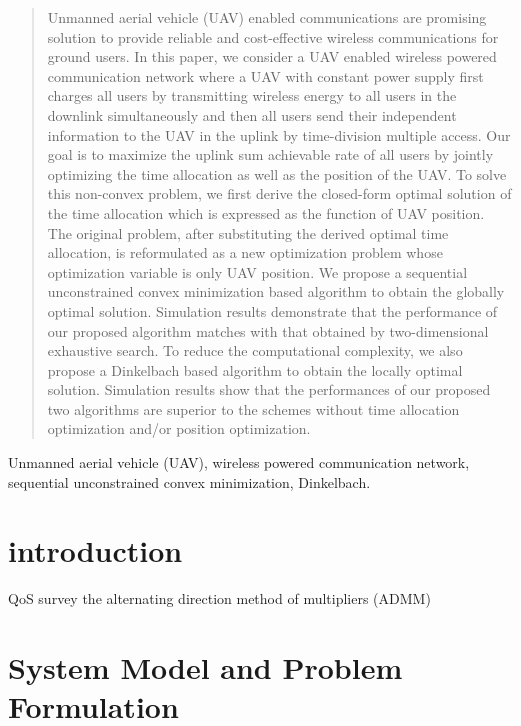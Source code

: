 \documentclass[journal]{IEEEtran}
\begin{document}
\maketitle
\begin{abstract}
Unmanned aerial vehicle (UAV) enabled communications are promising solution to provide reliable and cost-effective wireless communications
for ground users. In this paper, we consider a UAV enabled wireless powered communication network where a UAV with constant power supply first charges all users by transmitting wireless energy to all users in the downlink simultaneously and then all users send their independent information to the UAV in the uplink by time-division multiple access. Our goal is to maximize the uplink sum achievable rate of all users by jointly optimizing the time allocation as well as the position of the UAV. To solve this non-convex problem, we first derive the closed-form optimal solution of the time allocation which is expressed as the function of UAV position. The original problem, after substituting the derived optimal time allocation, is reformulated as a new optimization problem whose optimization variable is only UAV position. We propose a sequential unconstrained convex minimization based algorithm to obtain the globally optimal solution. Simulation results demonstrate that the performance of our proposed algorithm matches with that obtained by two-dimensional exhaustive search. To reduce the computational complexity, we also propose a Dinkelbach based algorithm to obtain the locally optimal solution. Simulation results show that the performances of our proposed two algorithms are superior to the schemes without time allocation optimization and/or position optimization.
\end{abstract}
\begin{IEEEkeywords} Unmanned aerial vehicle (UAV), wireless powered communication network, sequential unconstrained convex minimization, Dinkelbach.
\end{IEEEkeywords}
\IEEEpeerreviewmaketitle
	
\section{introduction}

QoS  survey the alternating direction method of multipliers (ADMM)
\section{System Model and Problem Formulation}
\end{document}
